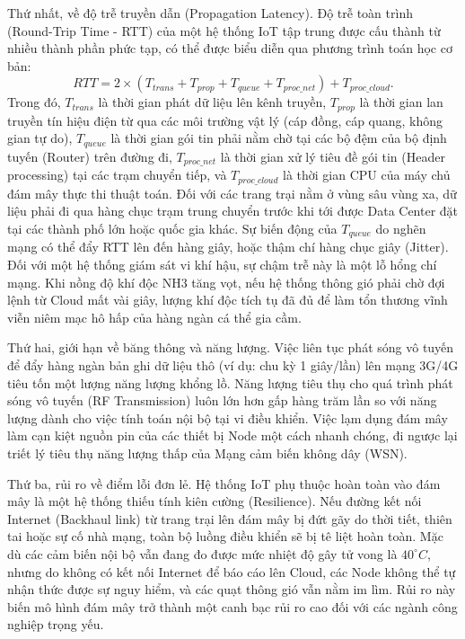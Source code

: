 Thứ nhất, về độ trễ truyền dẫn (Propagation Latency). Độ trễ toàn trình (Round-Trip Time - RTT) của một hệ thống IoT tập trung được cấu thành từ nhiều thành phần phức tạp, có thể được biểu diễn qua phương trình toán học cơ bản\cite{kurose2017computer}:
\begin{equation}
    {RTT = 2 \times (T_{trans} + T_{prop} + T_{queue} + T_{proc\_net}) + T_{proc\_cloud}}.
\end{equation}
Trong đó, $T_{trans}$ là thời gian phát dữ liệu lên kênh truyền, $T_{prop}$ là thời gian lan truyền tín hiệu điện từ qua các môi trường vật lý (cáp đồng, cáp quang, không gian tự do), $T_{queue}$ là thời gian gói tin phải nằm chờ tại các bộ đệm của bộ định tuyến (Router) trên đường đi, $T_{proc\_net}$ là thời gian xử lý tiêu đề gói tin (Header processing) tại các trạm chuyển tiếp, và $T_{proc\_cloud}$ là thời gian CPU của máy chủ đám mây thực thi thuật toán. 
Đối với các trang trại nằm ở vùng sâu vùng xa, dữ liệu phải đi qua hàng chục trạm trung chuyển trước khi tới được Data Center đặt tại các thành phố lớn hoặc quốc gia khác. Sự biến động của $T_{queue}$ do nghẽn mạng có thể đẩy RTT lên đến hàng giây, hoặc thậm chí hàng chục giây (Jitter). Đối với một hệ thống giám sát vi khí hậu, sự chậm trễ này là một lỗ hổng chí mạng. Khi nồng độ khí độc NH3 tăng vọt, nếu hệ thống thông gió phải chờ đợi lệnh từ Cloud mất vài giây, lượng khí độc tích tụ đã đủ để làm tổn thương vĩnh viễn niêm mạc hô hấp của hàng ngàn cá thể gia cầm.

Thứ hai, giới hạn về băng thông và năng lượng. Việc liên tục phát sóng vô tuyến để đẩy hàng ngàn bản ghi dữ liệu thô (ví dụ: chu kỳ 1 giây/lần) lên mạng 3G/4G tiêu tốn một lượng năng lượng khổng lồ. Năng lượng tiêu thụ cho quá trình phát sóng vô tuyến (RF Transmission) luôn lớn hơn gấp hàng trăm lần so với năng lượng dành cho việc tính toán nội bộ tại vi điều khiển. Việc lạm dụng đám mây làm cạn kiệt nguồn pin của các thiết bị Node một cách nhanh chóng, đi ngược lại triết lý tiêu thụ năng lượng thấp của Mạng cảm biến không dây (WSN).

Thứ ba, rủi ro về điểm lỗi đơn lẻ. Hệ thống IoT phụ thuộc hoàn toàn vào đám mây là một hệ thống thiếu tính kiên cường (Resilience). Nếu đường kết nối Internet (Backhaul link) từ trang trại lên đám mây bị đứt gãy do thời tiết, thiên tai hoặc sự cố nhà mạng, toàn bộ luồng điều khiển sẽ bị tê liệt hoàn toàn. Mặc dù các cảm biến nội bộ vẫn đang đo được mức nhiệt độ gây tử vong là $40^\circ C$, nhưng do không có kết nối Internet để báo cáo lên Cloud, các Node không thể tự nhận thức được sự nguy hiểm, và các quạt thông gió vẫn nằm im lìm. Rủi ro này biến mô hình đám mây trở thành một canh bạc rủi ro cao đối với các ngành công nghiệp trọng yếu.


